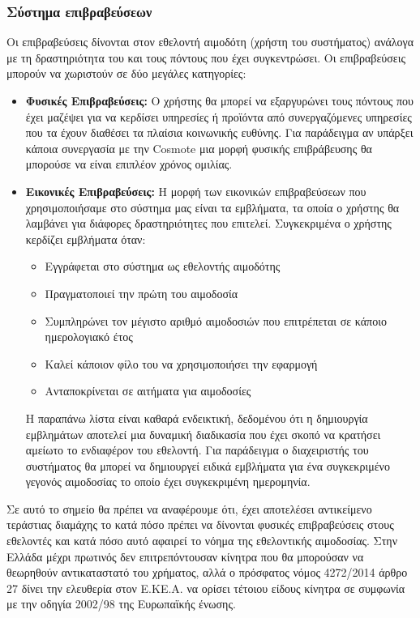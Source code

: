 	\subsubsection{Σύστημα επιβραβεύσεων}
	Οι επιβραβεύσεις δίνονται στον εθελοντή αιμοδότη (χρήστη του συστήματος) ανάλογα με τη δραστηριότητα του και τους πόντους που έχει συγκεντρώσει. Οι επιβραβεύσεις μπορούν να χωριστούν σε δύο μεγάλες κατηγορίες:
	\begin{itemize}
		\item \textbf{Φυσικές Επιβραβεύσεις:} Ο χρήστης θα μπορεί να εξαργυρώνει τους πόντους που έχει μαζέψει για να κερδίσει υπηρεσίες ή προϊόντα από συνεργαζόμενες υπηρεσίες που τα έχουν διαθέσει τα πλαίσια κοινωνικής ευθύνης. Για παράδειγμα αν υπάρξει κάποια συνεργασία με την Cosmote μια μορφή φυσικής επιβράβευσης θα μπορούσε να είναι επιπλέον χρόνος ομιλίας.
		 \item \textbf{Εικονικές Επιβραβεύσεις:} Η μορφή των εικονικών επιβραβεύσεων που χρησιμοποιήσαμε στο σύστημα μας είναι τα εμβλήματα, τα οποία ο χρήστης θα λαμβάνει για διάφορες δραστηριότητες που επιτελεί. Συγκεκριμένα ο χρήστης κερδίζει εμβλήματα όταν:
		 
		 	\begin{itemize}
		 		\item Εγγράφεται στο σύστημα ως εθελοντής αιμοδότης
		 		\item Πραγματοποιεί την πρώτη του αιμοδοσία
		 		\item Συμπληρώνει τον μέγιστο αριθμό αιμοδοσιών που επιτρέπεται σε κάποιο ημερολογιακό έτος
		 		\item Καλεί κάποιον φίλο του να χρησιμοποιήσει την εφαρμογή
		 		\item Ανταποκρίνεται σε αιτήματα για αιμοδοσίες
		 	\end{itemize}
		 	Η παραπάνω λίστα είναι καθαρά ενδεικτική, δεδομένου ότι η δημιουργία εμβλημάτων αποτελεί μια δυναμική διαδικασία που έχει σκοπό να κρατήσει αμείωτο το ενδιαφέρον του εθελοντή. Για παράδειγμα ο διαχειριστής του συστήματος θα μπορεί να δημιουργεί ειδικά εμβλήματα για ένα συγκεκριμένο γεγονός αιμοδοσίας το οποίο έχει συγκεκριμένη ημερομηνία.
	\end{itemize}
	
	Σε αυτό το σημείο θα πρέπει να αναφέρουμε ότι, έχει αποτελέσει αντικείμενο τεράστιας διαμάχης το κατά πόσο πρέπει να δίνονται φυσικές επιβραβεύσεις στους εθελοντές και κατά πόσο αυτό αφαιρεί το νόημα της εθελοντικής αιμοδοσίας. Στην Ελλάδα μέχρι πρωτινός δεν επιτρεπόντουσαν κίνητρα που θα μπορούσαν να θεωρηθούν αντικαταστατό του χρήματος, αλλά ο πρόσφατος νόμος 4272/2014 άρθρο 27 δίνει την ελευθερία στον Ε.ΚΕ.Α. να ορίσει τέτοιου είδους κίνητρα σε συμφωνία με την οδηγία 2002/98 της Ευρωπαϊκής ένωσης.
	
